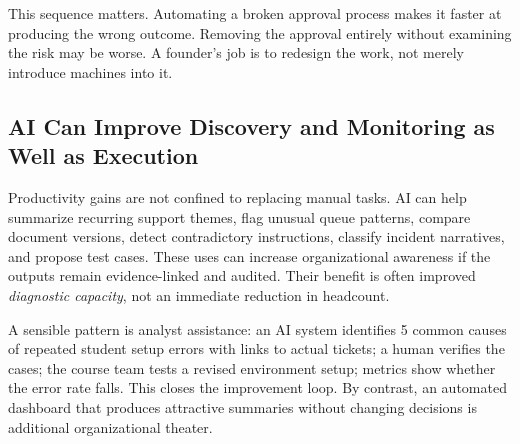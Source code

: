 This sequence matters. Automating a broken approval process makes it faster at producing the wrong outcome. Removing the approval entirely without examining the risk may be worse. A founder's job is to redesign the work, not merely introduce machines into it.

\subsection{AI Can Improve Discovery and Monitoring as Well as Execution}
\label{sec:ai_for_discovery_and_monitoring}

Productivity gains are not confined to replacing manual tasks. AI can help summarize recurring support themes, flag unusual queue patterns, compare document versions, detect contradictory instructions, classify incident narratives, and propose test cases. These uses can increase organizational awareness if the outputs remain evidence-linked and audited. Their benefit is often improved \textit{diagnostic capacity}, not an immediate reduction in headcount.

A sensible pattern is analyst assistance: an AI system identifies 5 common causes of repeated student setup errors with links to actual tickets; a human verifies the cases; the course team tests a revised environment setup; metrics show whether the error rate falls. This closes the improvement loop. By contrast, an automated dashboard that produces attractive summaries without changing decisions is additional organizational theater.
